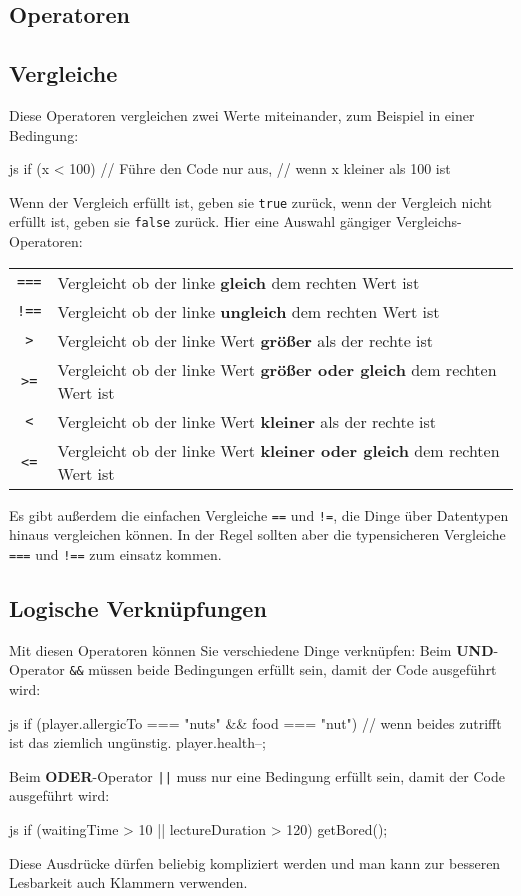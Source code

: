 \documentclass[10pt,a4paper]{article}
\begin{document}
\begin{multicols}{3}
\section*{Operatoren}
\subsection*{Vergleiche}
Diese Operatoren vergleichen zwei Werte miteinander, zum Beispiel in einer Bedingung:
\begin{codebox}{js}{}
  if (x < 100) {
    // Führe den Code nur aus,
    // wenn x kleiner als 100 ist
  }
\end{codebox}
Wenn der Vergleich erfüllt ist, geben sie \texttt{true} zurück, wenn der Vergleich nicht erfüllt ist, geben sie \texttt{false} zurück. Hier eine Auswahl gängiger Vergleichs-Operatoren:

\vspace{0.5cm}
\begin{tabular}{c l}
  \texttt{===} & Vergleicht ob der linke \textbf{gleich} dem rechten Wert ist \\
  \texttt{!==} & Vergleicht ob der linke \textbf{ungleich} dem rechten Wert ist \\
  \texttt{>} & Vergleicht ob der linke Wert \textbf{größer} als der rechte ist \\
  \texttt{>=} & Vergleicht ob der linke Wert \textbf{größer oder gleich} dem rechten Wert ist \\
  \texttt{<} & Vergleicht ob der linke Wert \textbf{kleiner} als der rechte ist \\
  \texttt{<=} & Vergleicht ob der linke Wert \textbf{kleiner oder gleich} dem rechten Wert ist \\
\end{tabular}

Es gibt außerdem die einfachen Vergleiche \texttt{==} und \texttt{!=}, die Dinge über Datentypen hinaus vergleichen können. In der Regel sollten aber die typensicheren Vergleiche \texttt{===} und \texttt{!==} zum einsatz kommen.

\subsection*{Logische Verknüpfungen}
Mit diesen Operatoren können Sie verschiedene Dinge verknüpfen:
Beim \textbf{UND}-Operator \texttt{\&\&} müssen beide Bedingungen erfüllt sein, damit der Code ausgeführt wird:
\begin{codebox}{js}{}
  if (player.allergicTo === "nuts" && food === "nut") {
    // wenn beides zutrifft ist das ziemlich ungünstig.
    player.health--;
  }
\end{codebox}
Beim \textbf{ODER}-Operator \texttt{||} muss nur eine Bedingung erfüllt sein, damit der Code ausgeführt wird:
\begin{codebox}{js}{}
  if (waitingTime > 10 || lectureDuration > 120) {
    getBored();
  }
\end{codebox}
Diese Ausdrücke dürfen beliebig kompliziert werden und man kann zur besseren Lesbarkeit auch Klammern verwenden.


\end{multicols}
\end{document}
